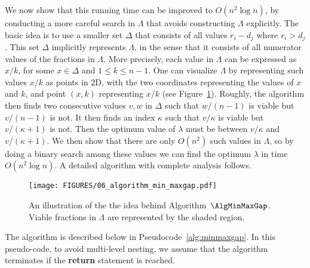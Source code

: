 We now show that this running time can be improved to $O(n^2\log n)$,
by conducting a more careful search in $\Lambda$ that avoids constructing $\Lambda$ explicitly. 
The basic idea is to use a smaller set $\Delta$ that consists of all values $r_i - d_j$ where $r_i > d_j$.
This set $\Delta$ implicitly represents $\Lambda$, in the sense that it consists of
all numerator values of the fractions in $\Lambda$. More precisely,
each value in $\Lambda$ can be expressed as $x/k$, for some $x\in \Delta$ and $1\le k \le n-1$. 
One can visualize $\Lambda$ by representing such values $x/k$ as points in 2D, 
with the two coordinates representing the values of $x$ and $k$, and point $(x,k)$ representing
$x/k$ (see Figure~\ref{fig: idea behind algorithm minmaxgap}). 
Roughly, the algorithm then finds two consecutive values $v,w$ in $\Delta$ such that
$w/(n-1)$ is viable but $v/(n-1)$ is not. It then finds an index $\kappa$ such that
$v/\kappa$ is viable but $v/(\kappa+1)$ is not. Then the optimum
value of $\lambda$ must be between $v/\kappa$ and $v/(\kappa+1)$. We then
show that there are only $O(n^2)$ such values in $\Lambda$, so by doing a binary
search among these values we can find the optimum $\lambda$ in time $O(n^2\log n)$. 
A detailed algorithm with complete analysis follows.

\begin{figure}[ht]
\centering
\texttt{[image: FIGURES/06\_algorithm\_min\_maxgap.pdf]} 
\caption{An illustration of the the idea behind Algorithm~$\AlgMinMaxGap$.
Viable fractions in $\Lambda$ are represented by the shaded region.
}
\label{fig: idea behind algorithm minmaxgap}
\end{figure}




\medskip

The algorithm is described below in Pseudocode~\ref{alg:minmaxgap}. In this pseudo-code,
to avoid multi-level nesting, we assume that the algorithm terminates if
the \textbf{return} statement is reached. 



